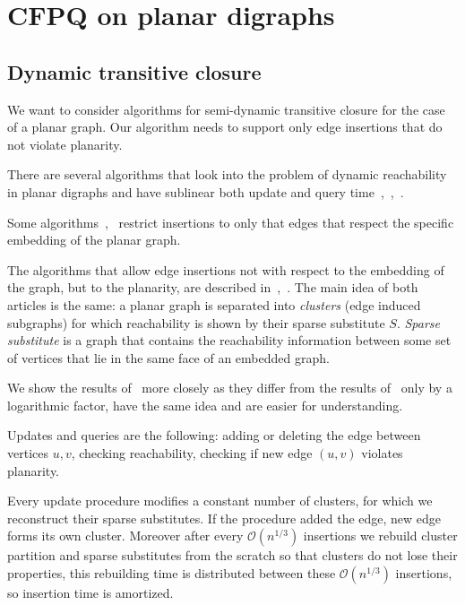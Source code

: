 \section{CFPQ on planar digraphs}

\subsection{Dynamic transitive closure}

We want to consider algorithms for semi-dynamic transitive closure for the case of a planar graph. Our algorithm needs to support only edge insertions that do not violate planarity.

There are several algorithms that look into the problem of dynamic reachability in planar digraphs and have sublinear both update and query time~\cite{10.5555/647903.739284},~\cite{karczmarz2018data},~\cite{kao2008encyclopedia}. 

Some algorithms~\cite{10.5555/1778580.1778635},~\cite{karczmarz2018data} restrict insertions to only that edges that respect the specific embedding of the planar graph. 


The algorithms that allow edge insertions not with respect to the embedding of the graph, but to the planarity, are described in~\cite{10.5555/647903.739284},~\cite{10.1145/300515.300517}. The main idea of both articles is the same: a planar graph is separated into \textit{clusters} (edge induced subgraphs) for which reachability is shown by their sparse substitute $S$. \textit{Sparse substitute} is a graph that contains the reachability information between some set of vertices that lie in the same face of an embedded graph.

We show the results of~\cite{10.5555/647903.739284} more closely as they differ from the results of~\cite{10.1145/300515.300517} only by a logarithmic factor, have the same idea and are easier for understanding. 

Updates and queries are the following: adding or deleting the edge between vertices $u, v$, checking reachability, checking if new edge $(u, v)$ violates planarity. 

Every update procedure modifies a constant number of clusters, for which we reconstruct their sparse substitutes. If the procedure added the edge, new edge forms its own cluster. Moreover after every $\mathcal{O}(n^{1/3})$ insertions we rebuild cluster partition and sparse substitutes from the scratch so that clusters do not lose their properties, this rebuilding time is distributed between these $\mathcal{O}(n^{1/3})$ insertions, so insertion time is amortized. 

